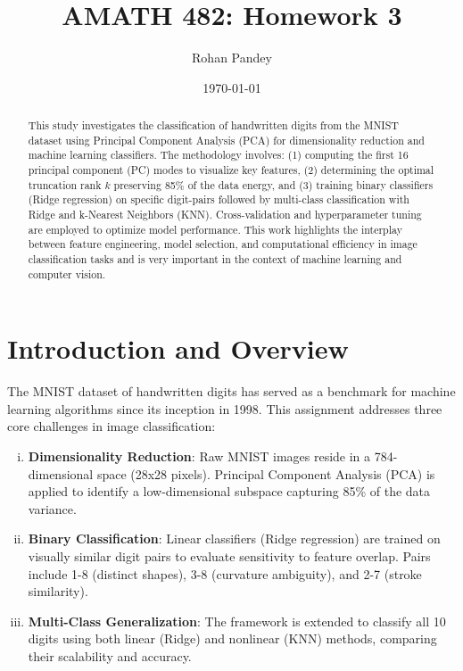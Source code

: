 \documentclass[11pt]{amsart}
\title{AMATH 482: Homework 3}
\author{Rohan Pandey} %
\date{\today} %
\begin{document}
\begin{abstract}
    This study investigates the classification of handwritten digits from the MNIST dataset using Principal Component Analysis (PCA) for dimensionality reduction and machine learning classifiers. The methodology involves: (1) computing the first 16 principal component (PC) modes to visualize key features, (2) determining the optimal truncation rank \( k \) preserving 85\% of the data energy, and (3) training binary classifiers (Ridge regression) on specific digit-pairs followed by multi-class classification with Ridge and k-Nearest Neighbors (KNN). Cross-validation and hyperparameter tuning are employed to optimize model performance. This work highlights the interplay between feature engineering, model selection, and computational efficiency in image classification tasks and is very important in the context of machine learning and computer vision.
\end{abstract}

\maketitle

\section{Introduction and Overview}\label{sec:Introduction}

The MNIST dataset of handwritten digits \cite{LeCun1998} has served as a benchmark for machine learning algorithms since its inception in 1998. This assignment addresses three core challenges in image classification: 

\begin{enumerate}[(i)]
    \item \textbf{Dimensionality Reduction}: Raw MNIST images reside in a 784-dimensional space (28x28 pixels). Principal Component Analysis (PCA) is applied to identify a low-dimensional subspace capturing 85\% of the data variance.
    \item \textbf{Binary Classification}: Linear classifiers (Ridge regression) are trained on visually similar digit pairs to evaluate sensitivity to feature overlap. Pairs include 1-8 (distinct shapes), 3-8 (curvature ambiguity), and 2-7 (stroke similarity).
    \item \textbf{Multi-Class Generalization}: The framework is extended to classify all 10 digits using both linear (Ridge) and nonlinear (KNN) methods, comparing their scalability and accuracy.
\end{enumerate}
\end{document}
